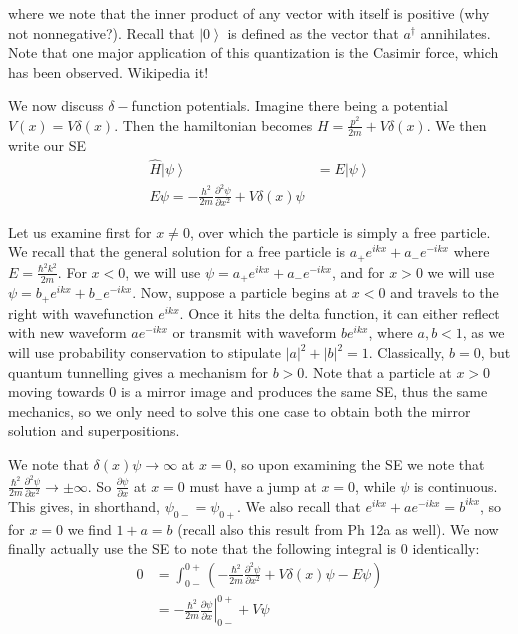 \documentclass{report}
\newcommand{\ket}[1]{\left| #1 \right>} %
\begin{document}
where we note that the inner product of any vector with itself is positive (why not nonnegative?). Recall that $\ket{0}$ is defined as the vector that $a^\dagger$ annihilates. Note that one major application of this quantization is the Casimir force, which has been observed. Wikipedia it!

We now discuss $\delta-$function potentials. Imagine there being a potential $V(x) = V\delta(x)$. Then the hamiltonian becomes $H = \frac{p^2}{2m} + V\delta(x)$. We then write our SE
\begin{align*}
\hat{H}\left|\psi\right> &= E\left|\psi\right>\\
E\psi = -\frac{h^2}{2m}\frac{\partial^2 \psi}{\partial x^2} + V\delta(x)\psi
\end{align*}

Let us examine first for $x \neq 0$, over which the particle is simply a free particle. We recall that the general solution for a free particle is $a_+e^{ikx} + a_-e^{-ikx}$ where $E = \frac{\hbar^2k^2}{2m}$. For $x < 0$, we will use $\psi = a_+e^{ikx} + a_-e^{-ikx}$, and for $x > 0$ we will use $\psi = b_+e^{ikx} + b_-e^{-ikx}$. Now, suppose a particle begins at $x < 0$ and travels to the right with wavefunction $e^{ikx}$. Once it hits the delta function, it can either reflect with new waveform $ae^{-ikx}$ or transmit with waveform $be^{ikx}$, where $a,b < 1$, as we will use probability conservation to stipulate $|a|^2 + |b|^2 = 1$. Classically, $b=0$, but quantum tunnelling gives a mechanism for $b > 0$. Note that a particle at $x > 0$ moving towards $0$ is a mirror image and produces the same SE, thus the same mechanics, so we only need to solve this one case to obtain both the mirror solution and superpositions.

We note that $\delta(x)\psi \to \infty$ at $x = 0$, so upon examining the SE we note that $\frac{\hbar^2}{2m}\frac{\partial^2\psi}{\partial x^2} \to \pm \infty$. So $\frac{\partial \psi}{\partial x}$ at $x = 0$ must have a jump at $x = 0$, while $\psi$ is continuous. This gives, in shorthand, $\psi_{0-} = \psi_{0+}$. We also recall that $e^{ikx} + ae^{-ikx} = b^{ikx}$, so for $x = 0$ we find $1+a = b$ (recall also this result from Ph 12a as well). We now finally actually use the SE to note that the following integral is 0 identically:
\begin{align*}
0 &= \int_{0-}^{0+} \left(-\frac{\hbar^2}{2m}\frac{\partial^2\psi}{\partial x^2} + V\delta(x)\psi - E\psi\right)\\
&= -\frac{\hbar^2}{2m}\left.\frac{\partial \psi}{\partial x}\right|_{0-}^{0+} + V\psi
\end{align*}
\end{document}
